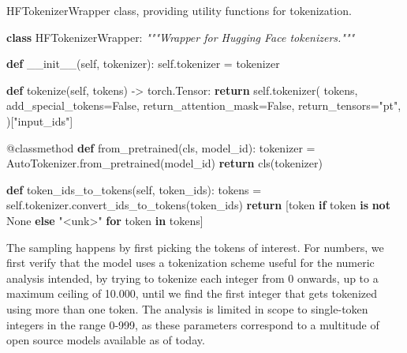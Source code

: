 \documentclass[
  a4paper, twoside, 10pt, titlepage]{book}
\newenvironment{Shaded}{}{}
\newcommand{\AttributeTok}[1]{\textcolor[rgb]{0.49,0.56,0.16}{#1}}
\newcommand{\CommentTok}[1]{\textcolor[rgb]{0.38,0.63,0.69}{\textit{#1}}}
\newcommand{\ControlFlowTok}[1]{\textcolor[rgb]{0.00,0.44,0.13}{\textbf{#1}}}
\newcommand{\FunctionTok}[1]{\textcolor[rgb]{0.02,0.16,0.49}{#1}}
\newcommand{\KeywordTok}[1]{\textcolor[rgb]{0.00,0.44,0.13}{\textbf{#1}}}
\newcommand{\NormalTok}[1]{#1}
\newcommand{\OperatorTok}[1]{\textcolor[rgb]{0.40,0.40,0.40}{#1}}
\newcommand{\StringTok}[1]{\textcolor[rgb]{0.25,0.44,0.63}{#1}}
\newcommand{\VariableTok}[1]{\textcolor[rgb]{0.10,0.09,0.49}{#1}}
\begin{document}
\begin{codelisting}

\caption{HFTokenizerWrapper class, providing utility functions for
tokenization.}\label{lst:tokenizer}

\begin{Shaded}
\begin{Highlighting}[]
\KeywordTok{class}\NormalTok{ HFTokenizerWrapper:}
    \CommentTok{"""Wrapper for Hugging Face tokenizers."""}

    \KeywordTok{def} \FunctionTok{\_\_init\_\_}\NormalTok{(}\VariableTok{self}\NormalTok{, tokenizer):}
        \VariableTok{self}\NormalTok{.tokenizer }\OperatorTok{=}\NormalTok{ tokenizer}

    \KeywordTok{def}\NormalTok{ tokenize(}\VariableTok{self}\NormalTok{, tokens) }\OperatorTok{{-}\textgreater{}}\NormalTok{ torch.Tensor:}
        \ControlFlowTok{return} \VariableTok{self}\NormalTok{.tokenizer(}
\NormalTok{            tokens,}
\NormalTok{            add\_special\_tokens}\OperatorTok{=}\VariableTok{False}\NormalTok{,}
\NormalTok{            return\_attention\_mask}\OperatorTok{=}\VariableTok{False}\NormalTok{,}
\NormalTok{            return\_tensors}\OperatorTok{=}\StringTok{"pt"}\NormalTok{,}
\NormalTok{        )[}\StringTok{"input\_ids"}\NormalTok{]}

    \AttributeTok{@classmethod}
    \KeywordTok{def}\NormalTok{ from\_pretrained(cls, model\_id):}
\NormalTok{        tokenizer }\OperatorTok{=}\NormalTok{ AutoTokenizer.from\_pretrained(model\_id)}
        \ControlFlowTok{return}\NormalTok{ cls(tokenizer)}

    \KeywordTok{def}\NormalTok{ token\_ids\_to\_tokens(}\VariableTok{self}\NormalTok{, token\_ids):}
\NormalTok{        tokens }\OperatorTok{=} \VariableTok{self}\NormalTok{.tokenizer.convert\_ids\_to\_tokens(token\_ids)}
        \ControlFlowTok{return}\NormalTok{ [token }\ControlFlowTok{if}\NormalTok{ token }\KeywordTok{is} \KeywordTok{not} \VariableTok{None} \ControlFlowTok{else} \StringTok{"\textless{}unk\textgreater{}"} \ControlFlowTok{for}\NormalTok{ token }\KeywordTok{in}\NormalTok{ tokens]}
\end{Highlighting}
\end{Shaded}

\end{codelisting}

The sampling happens by first picking the tokens of interest. For
numbers, we first verify that the model uses a tokenization scheme
useful for the numeric analysis intended, by trying to tokenize each
integer from 0 onwards, up to a maximum ceiling of 10.000, until we find
the first integer that gets tokenized using more than one token. The
analysis is limited in scope to single-token integers in the range
0-999, as these parameters correspond to a multitude of open source
models available as of today.
\end{document}
